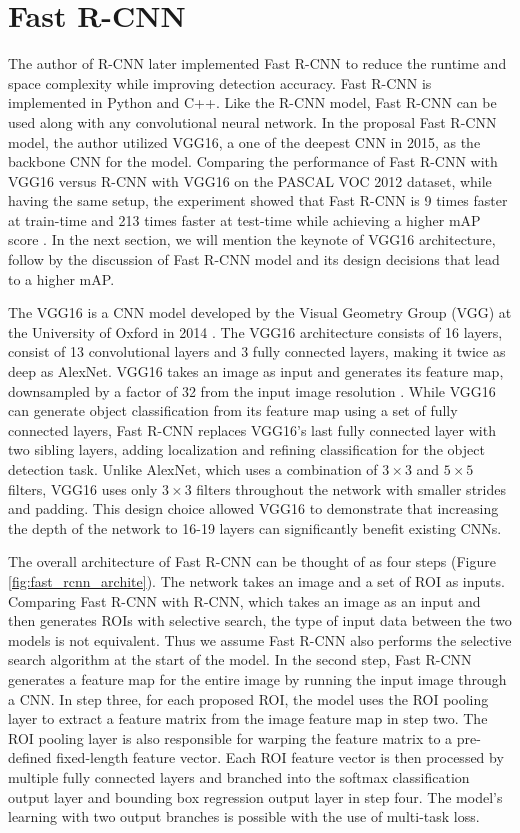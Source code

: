 \section{Fast R-CNN}

The author of R-CNN later implemented Fast R-CNN to reduce the runtime and space complexity while improving detection accuracy. Fast R-CNN is implemented in Python and C++. Like the R-CNN model, Fast R-CNN can be used along with any convolutional neural network. In the proposal Fast R-CNN model, the author utilized VGG16, a one of the deepest CNN in 2015, as the backbone CNN for the model. Comparing the performance of Fast R-CNN with VGG16 versus R-CNN with VGG16 on the PASCAL VOC 2012 dataset, while having the same setup, the experiment showed that Fast R-CNN is 9 times faster at train-time and 213 times faster at test-time while achieving a higher mAP score \cite{fast_rcnn_og}. In the next section, we will mention the keynote of VGG16 architecture, follow by the discussion of Fast R-CNN model and its design decisions that lead to a higher mAP.

The VGG16 is a CNN model developed by the Visual Geometry Group (VGG) at the University of Oxford in 2014 \cite{vgg16_2014}. The VGG16 architecture consists of 16 layers, consist of 13 convolutional layers and 3 fully connected layers, making it twice as deep as AlexNet. VGG16 takes an image as input and generates its feature map, downsampled by a factor of 32 from the input image resolution \cite{deconv_rcnn_2018}. While VGG16 can generate object classification from its feature map using a set of fully connected layers, Fast R-CNN replaces VGG16's last fully connected layer with two sibling layers, adding localization and refining classification for the object detection task. Unlike AlexNet, which uses a combination of $3 \times 3$ and $5 \times 5$ filters, VGG16 uses only $3 \times 3$ filters throughout the network with smaller strides and padding. This design choice allowed VGG16 to demonstrate that increasing the depth of the network to 16-19 layers can significantly benefit existing CNNs. 

The overall architecture of Fast R-CNN can be thought of as four steps (Figure \ref{fig:fast_rcnn_archite}). The network takes an image and a set of ROI as inputs. Comparing Fast R-CNN with R-CNN, which takes an image as an input and then generates ROIs with selective search, the type of input data between the two models is not equivalent. Thus we assume Fast R-CNN also performs the selective search algorithm at the start of the model. In the second step, Fast R-CNN generates a feature map for the entire image by running the input image through a CNN. In step three, for each proposed ROI, the model uses the ROI pooling layer to extract a feature matrix from the image feature map in step two. The ROI pooling layer is also responsible for warping the feature matrix to a pre-defined fixed-length feature vector. Each ROI feature vector is then processed by multiple fully connected layers and branched into the softmax classification output layer and bounding box regression output layer in step four. The model's learning with two output branches is possible with the use of multi-task loss.

